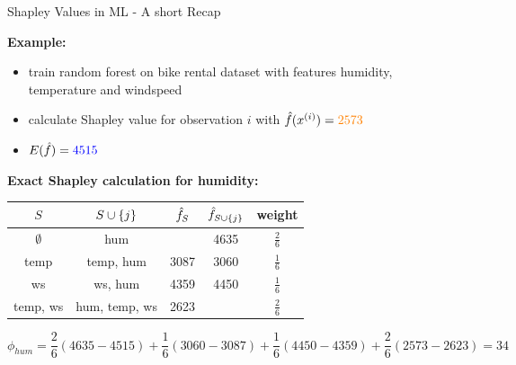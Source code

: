 \documentclass[11pt,compress,t,notes=noshow, aspectratio=169, xcolor=table]{beamer}
\begin{document}
\begin{vbframe}{Shapley Values in ML - A short Recap}
  
  \textbf{Example:} 
  \begin{itemize}
      \item train random forest on bike rental dataset with features humidity, temperature and windspeed
      \item calculate Shapley value for observation $i$ with $\fh(x^{(i)}) = \color{orange}{2573}$
      \item $E(\fh) = \color{blue}{4515}$
  \end{itemize}
  \textbf{Exact Shapley calculation for humidity:} 
  \begin{table}[T]
      \centering
      \begin{tabular}{c|c|c|c|c}
   $S$    &  $\Scupj$  & $\fh_S$ &  $\fh_{\Scupj}$  & weight\\\hline
     $\emptyset$&    hum  & \color{blue}{4515} & 4635 & $\frac{2}{6}$\\
       temp &  temp, hum & 3087 & 3060& $\frac{1}{6}$\\
       ws &  ws, hum & 4359  & 4450 & $\frac{1}{6}$\\
       temp, ws &  hum, temp, ws & 2623 & \color{orange}{2573} & $\frac{2}{6}$
         
      \end{tabular}
      \label{tab:my_label}
  \end{table}

$$
\phi_{hum} = \frac{2}{6} (4635-4515) + \frac{1}{6} (3060-3087) + \frac{1}{6} (4450-4359) + \frac{2}{6} (2573-2623) = 34
$$

\end{vbframe}
\end{document}
